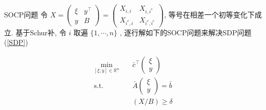 \documentclass[slidestop, compress, mathserif, UTF8]{beamer}
\numberwithin{equation}{section}                                        %
\begin{document}
            \begin{frame}[t]{SOCP问题}
                令
                $
                        X
                    =	\begin{pmatrix}
                            \xi & y^\top \\
                            y & B
                        \end{pmatrix}
                    =	\begin{pmatrix}
                            X_{i, i} & X_{i, i^c} \\
                            X_{i^c, i} & X_{i^c, i^c}
                        \end{pmatrix}
                $,
                等号在相差一个初等变化下成立. 基于Schur补, 令 $i$ 取遍 $\{1, \cdots, n\}$ , 逐行解如下的SOCP问题来解决SDP问题(\ref{SDP})

                \begin{equation}
                    \begin{split}\label{SOCP}
                        \min_{[\xi; y] \in \mathbb{R}^{n}} \quad
                            & \bar{c}^\top \begin{pmatrix}\xi \\ y\end{pmatrix}\\
                        \text{s.t.} \quad
                            & \bar{A} \begin{pmatrix}\xi \\ y\end{pmatrix} = \bar{b}\\
                            & (X/B) \geq \delta
                    \end{split}
                \end{equation}
            \end{frame}
\end{document}
